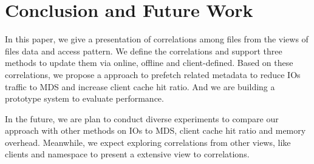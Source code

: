 \section{Conclusion and Future Work}

In this paper, we give a presentation of correlations among files from the views of files data and access pattern. We define the correlations and support three methods to update them via online, offline and client-defined. Based on these correlations, we propose a approach to prefetch related metadata to reduce IOs traffic to MDS and increase client cache hit ratio. And we are building a prototype system to evaluate performance.

In the future, we are plan to conduct diverse experiments to compare our approach with other methods on IOs to MDS, client cache hit ratio and memory overhead. Meanwhile, we expect exploring correlations from other views, like clients and namespace to present a extensive view to correlations. 